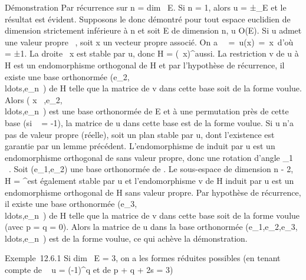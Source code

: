 \documentclass[]{article}
\begin{document}
Démonstration Par récurrence sur n = dim~ E. Si
n = 1, alors u = ±\mathrmId_E et le résultat
est évident. Supposons le donc démontré pour tout espace euclidien de
dimension strictement inférieure à n et soit E de dimension n, u \in O(E).
Si u admet une valeur propre \lambda~, soit x un vecteur propre associé. On a
\lambda~\x\
=\ u(x)\
=\ x\, d'où \lambda~ = ±1. La
droite ~x est stable par u, donc H = (~x)^\bot aussi. La
restriction v de u à H est un endomorphisme orthogonal de H et par
l'hypothèse de récurrence, il existe une base orthonormée
(e_2,\\ldots,e_n~)
de H telle que la matrice de v dans cette base soit de la forme voulue.
Alors ( x \over
\x\
,e_2,\\ldots,e_n~)
est une base orthonormée de E et à une permutation près de cette base
(si \lambda~ = -1), la matrice de u dans cette base est de la forme voulue. Si
u n'a pas de valeur propre (réelle), soit \Pi un plan stable par u, dont
l'existence est garantie par un lemme précédent. L'endomorphisme de \Pi
induit par u est un endomorphisme orthogonal de \Pi sans valeur propre,
donc une rotation d'angle \theta_1 \in \mathbb{R}~ \diagdown \pi~. Soit
(e_1,e_2) une base orthonormée de \Pi. Le sous-espace de
dimension n - 2, H = \Pi^\bot est également stable par u et
l'endomorphisme v de H induit par u est un endomorphisme orthogonal de H
sans valeur propre. Par hypothèse de récurrence, il existe une base
orthonormée
(e_3,\\ldots,e_n~)
de H telle que la matrice de v dans cette base soit de la forme voulue
(avec p = q = 0). Alors la matrice de u dans la base orthonormée
(e_1,e_2,e_3,\\ldots,e_n~)
est de la forme voulue, ce qui achève la démonstration.

Exemple~12.6.1 Si dim~ E = 3, on a les formes
réduites possibles (en tenant compte de
~ u =
(-1)^q et de p + q + 2s = 3)
\end{document}
